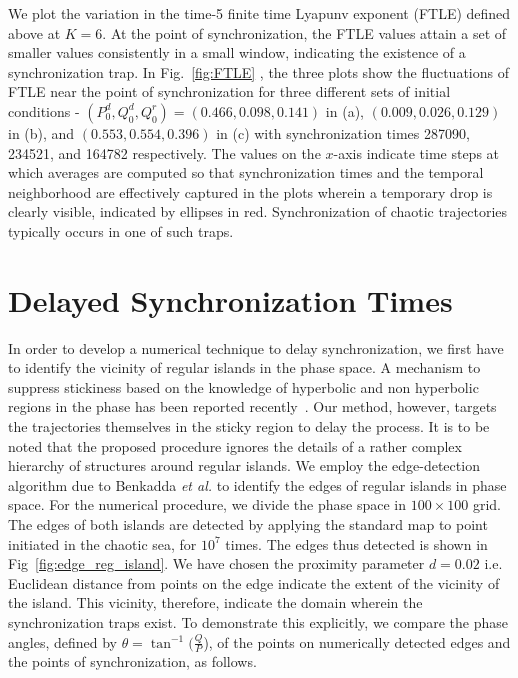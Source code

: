 \documentclass[reprint,amsmath,amssymb,aps,pre]{revtex4-1}
\begin{document}
We plot the variation in the time-5 finite time Lyapunv exponent (FTLE) defined above at $K = 6$. At the point of synchronization, the FTLE values attain a set of smaller values consistently in a small window, indicating the existence of a synchronization trap.  In Fig.~\ref{fig:FTLE} , the three plots show the fluctuations  of FTLE near the point of synchronization for three different sets of initial conditions - $(P^d_0,Q^d_0,Q^r_0) = (0.466,0.098,0.141)$ in (a), $(0.009,0.026,0.129)$ in (b), and $(0.553,0.554,0.396)$ in (c) with 
synchronization times 287090, 234521, and 164782 respectively. The values on 
the $x$-axis indicate time steps at which averages are computed so that 
synchronization times and the temporal neighborhood are effectively captured 
in the plots wherein a temporary drop is clearly visible, indicated by 
ellipses in red. Synchronization of chaotic trajectories typically occurs in 
one of such traps. 

\section{Delayed Synchronization Times}
\label{sec:delay}
In order to develop a numerical technique to delay synchronization, we  first 
have to identify the vicinity of regular islands in the phase space. A 
mechanism  to suppress stickiness based on the knowledge of hyperbolic and non 
hyperbolic regions in the phase has been reported recently~\cite{Kruger2015}. 
Our method, however, targets the trajectories themselves in the sticky region 
to delay the process.  It is to be noted that the proposed procedure ignores 
the details of a rather complex hierarchy of structures around regular 
islands. We employ the edge-detection algorithm due to Benkadda {\it et al.} 
\cite{Benkadda1997} to identify the edges of regular islands in phase space. 
For the numerical procedure, we divide the phase space in $100 \times 100$ 
grid. The edges of both islands are detected by applying the standard map 
to point initiated in the chaotic sea, for $10^7$ times.  The edges thus 
detected is shown in Fig~\ref{fig:edge_reg_island}.  We have chosen the 
proximity parameter $d=0.02$ i.e. Euclidean distance from points 
on the edge indicate the extent of the vicinity of the island.  This vicinity, 
therefore, indicate the domain wherein the synchronization traps exist.  To 
demonstrate this explicitly, we compare the phase angles, defined by $\theta = 
\tan^{-1}(\frac{Q}{P}$), of the points on numerically detected edges and 
the points of synchronization, as 
follows.
\end{document}
